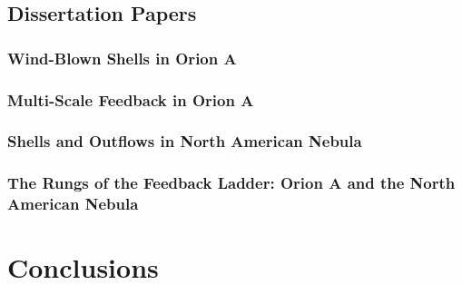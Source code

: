     \subsection{Dissertation Papers}\label{sec:papers}
        \subsubsection{Wind-Blown Shells in Orion A}\label{sec:paper1}
        \subsubsection{Multi-Scale Feedback in Orion A}\label{sec:paper2}
        \subsubsection{Shells and Outflows in North American Nebula}\label{sec:paper3}
        \subsubsection{The Rungs of the Feedback Ladder: Orion A and the North American Nebula}\label{sec:paper4}
\section{Conclusions}\label{sec:conclusions}
    
    


  
  